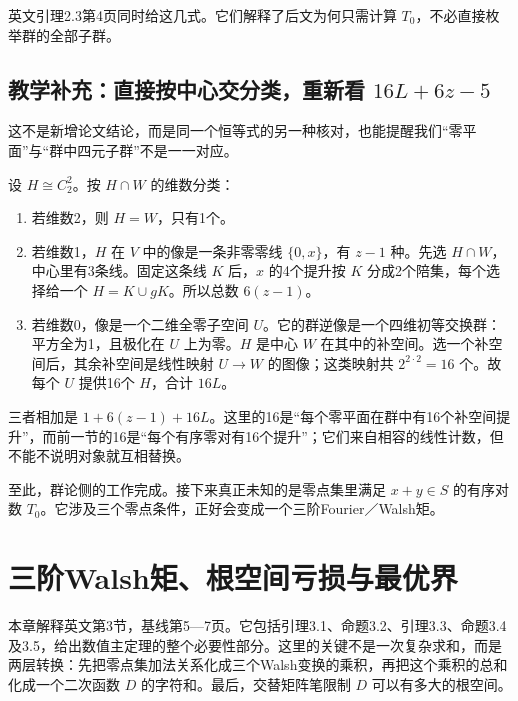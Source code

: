 \documentclass[UTF8,fontset=fandol,zihao=-4,openany,oneside]{ctexbook}
\begin{document}
英文引理2.3第4页同时给这几式。它们解释了后文为何只需计算 \(T_0\)，不必直接枚举群的全部子群。



\section{教学补充：直接按中心交分类，重新看 \texorpdfstring{\(16L+6z-5\)}{16L+6z-5}}


这不是新增论文结论，而是同一个恒等式的另一种核对，也能提醒我们“零平面”与“群中四元子群”不是一一对应。



设 \(H\cong C_2^2\)。按 \(H\cap W\) 的维数分类：



\begin{enumerate}


\item 若维数2，则 \(H=W\)，只有1个。

\item 若维数1，\(H\) 在 \(V\) 中的像是一条非零零线 \(\{0,x\}\)，有 \(z-1\) 种。先选 \(H\cap W\)，中心里有3条线。固定这条线 \(K\) 后，\(x\) 的4个提升按 \(K\) 分成2个陪集，每个选择给一个 \(H=K\cup gK\)。所以总数 \(6(z-1)\)。

\item 若维数0，像是一个二维全零子空间 \(U\)。它的群逆像是一个四维初等交换群：平方全为1，且极化在 \(U\) 上为零。\(H\) 是中心 \(W\) 在其中的补空间。选一个补空间后，其余补空间是线性映射 \(U\to W\) 的图像；这类映射共 \(2^{2\cdot2}=16\) 个。故每个 \(U\) 提供16个 \(H\)，合计 \(16L\)。

\end{enumerate}


三者相加是 \(1+6(z-1)+16L\)。这里的16是“每个零平面在群中有16个补空间提升”，而前一节的16是“每个有序零对有16个提升”；它们来自相容的线性计数，但不能不说明对象就互相替换。



至此，群论侧的工作完成。接下来真正未知的是零点集里满足 \(x+y\in S\) 的有序对数 \(T_0\)。它涉及三个零点条件，正好会变成一个三阶Fourier／Walsh矩。



\chapter{三阶Walsh矩、根空间亏损与最优界}


本章解释英文第3节，基线第5—7页。它包括引理3.1、命题3.2、引理3.3、命题3.4及3.5，给出数值主定理的整个必要性部分。这里的关键不是一次复杂求和，而是两层转换：先把零点集加法关系化成三个Walsh变换的乘积，再把这个乘积的总和化成一个二次函数 \(D\) 的字符和。最后，交替矩阵笔限制 \(D\) 可以有多大的根空间。
\end{document}
